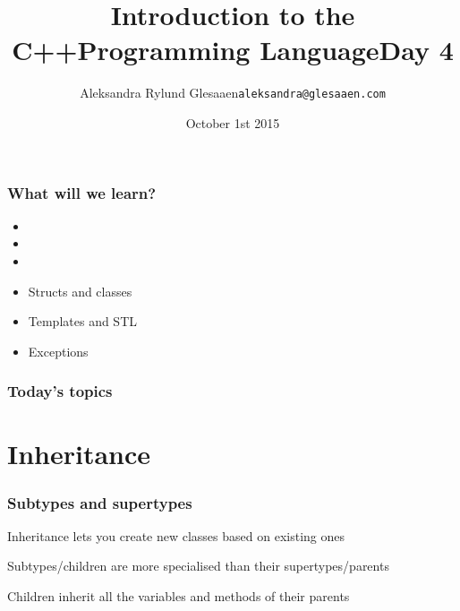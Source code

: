 \documentclass[14pt,a4paper,dvipsnames,usenames]{beamer}
\title[C++ Day4]{Introduction to the C++\newline{}Programming Language\newline{}\newline{}\fontsize{16pt}{16pt}\selectfont{}Day 4}
\author{\texorpdfstring{%
    Aleksandra Rylund Glesaaen\newline\fontsize{12pt}{12pt}\selectfont\texttt{aleksandra@glesaaen.com}%
  }{%
    Aleksandra Rylund Glesaaen}}
\date{October 1st 2015}
\begin{document}
\frame{\titlepage}

\begin{frame}
  \frametitle{What will we learn?}

  \begin{itemize}
    \setlength\itemsep{.5em}
    \item {}
    \item {}
    \item {}
    \item Structs and classes 
    \item Templates and STL 
    \item Exceptions 
  \end{itemize}
\end{frame}

\begin{frame}
  \frametitle{Today's topics}

  \tableofcontents
  
\end{frame}

\section{Inheritance}

\frame[plain]{\sectionpage}

\begin{frame}
  \frametitle{Subtypes and supertypes}

  Inheritance lets you create new classes based on existing ones

  \vspace{1em}
  Subtypes/children are more specialised than their supertypes/parents

  \vspace{1em}
  Children inherit all the variables and methods of their parents

\end{frame}
\end{document}
